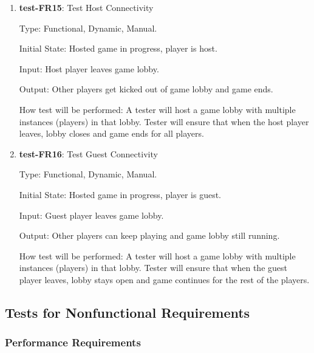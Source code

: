 \documentclass[12pt, titlepage]{article}
\begin{document}
\begin{enumerate}

\item{\textbf{test-FR15}: Test Host Connectivity\\}

Type: Functional, Dynamic, Manual.
					
Initial State: Hosted game in progress, player is host.
					
Input: Host player leaves game lobby.
					
Output: Other players get kicked out of game lobby and game ends.
					
How test will be performed: A tester will host a game lobby with multiple instances (players) in that lobby. Tester will ensure that when the host player leaves, lobby closes and game ends for all players.

\item{\textbf{test-FR16}: Test Guest Connectivity\\}

Type: Functional, Dynamic, Manual.
					
Initial State: Hosted game in progress, player is guest.
					
Input: Guest player leaves game lobby.
					
Output: Other players can keep playing and game lobby still running.
					
How test will be performed: A tester will host a game lobby with multiple instances (players) in that lobby. Tester will ensure that when the guest player leaves, lobby stays open and game continues for the rest of the players.

\end{enumerate}


\subsection{Tests for Nonfunctional Requirements}

\subsubsection{Performance Requirements}
\end{document}
